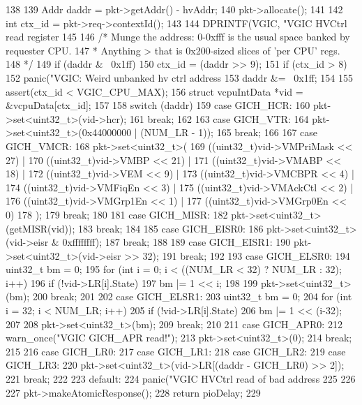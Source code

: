 \begin{DoxyCode}
138 {
139     Addr daddr = pkt->getAddr() - hvAddr;
140     pkt->allocate();
141 
142     int ctx_id = pkt->req->contextId();
143 
144     DPRINTF(VGIC, "VGIC HVCtrl read register %
145 
146     /* Munge the address: 0-0xfff is the usual space banked by requester CPU.
147      * Anything > that is 0x200-sized slices of 'per CPU' regs.
148      */
149     if (daddr & ~0x1ff) {
150         ctx_id = (daddr >> 9);
151         if (ctx_id > 8)
152             panic("VGIC: Weird unbanked hv ctrl address %
153         daddr &= ~0x1ff;
154     }
155     assert(ctx_id < VGIC_CPU_MAX);
156     struct vcpuIntData *vid = &vcpuData[ctx_id];
157 
158     switch (daddr) {
159       case GICH_HCR:
160         pkt->set<uint32_t>(vid->hcr);
161         break;
162 
163       case GICH_VTR:
164         pkt->set<uint32_t>(0x44000000 | (NUM_LR - 1));
165         break;
166 
167       case GICH_VMCR:
168         pkt->set<uint32_t>(
169             ((uint32_t)vid->VMPriMask << 27) |
170             ((uint32_t)vid->VMBP << 21) |
171             ((uint32_t)vid->VMABP << 18) |
172             ((uint32_t)vid->VEM << 9) |
173             ((uint32_t)vid->VMCBPR << 4) |
174             ((uint32_t)vid->VMFiqEn << 3) |
175             ((uint32_t)vid->VMAckCtl << 2) |
176             ((uint32_t)vid->VMGrp1En << 1) |
177             ((uint32_t)vid->VMGrp0En << 0)
178             );
179         break;
180 
181       case GICH_MISR:
182         pkt->set<uint32_t>(getMISR(vid));
183         break;
184 
185       case GICH_EISR0:
186         pkt->set<uint32_t>(vid->eisr & 0xffffffff);
187         break;
188 
189       case GICH_EISR1:
190         pkt->set<uint32_t>(vid->eisr >> 32);
191         break;
192 
193       case GICH_ELSR0: {
194           uint32_t bm = 0;
195           for (int i = 0; i < ((NUM_LR < 32) ? NUM_LR : 32); i++) {
196               if (!vid->LR[i].State)
197                   bm |= 1 << i;
198           }
199           pkt->set<uint32_t>(bm);
200       } break;
201 
202       case GICH_ELSR1: {
203           uint32_t bm = 0;
204           for (int i = 32; i < NUM_LR; i++) {
205               if (!vid->LR[i].State)
206                   bm |= 1 << (i-32);
207           }
208           pkt->set<uint32_t>(bm);
209       } break;
210 
211       case GICH_APR0:
212         warn_once("VGIC GICH_APR read!\n");
213         pkt->set<uint32_t>(0);
214         break;
215 
216       case GICH_LR0:
217       case GICH_LR1:
218       case GICH_LR2:
219       case GICH_LR3:
220         pkt->set<uint32_t>(vid->LR[(daddr - GICH_LR0) >> 2]);
221         break;
222 
223       default:
224         panic("VGIC HVCtrl read of bad address %
225     }
226 
227     pkt->makeAtomicResponse();
228     return pioDelay;
229 }
\end{DoxyCode}
